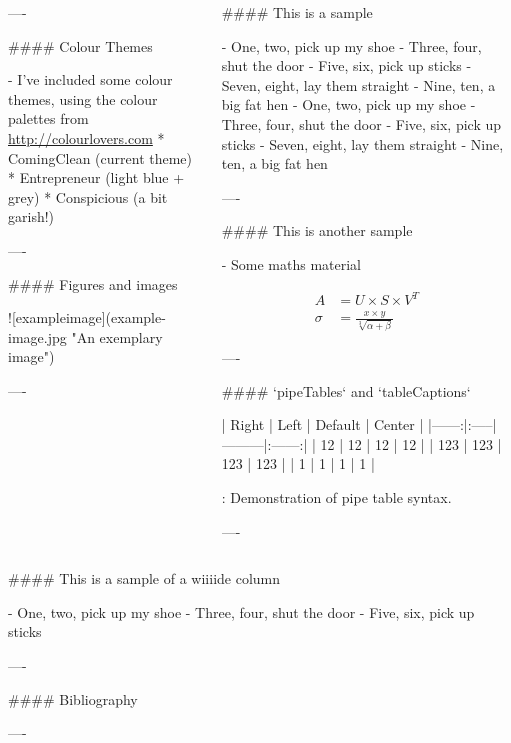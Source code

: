 \documentclass{beamer}
\begin{document}
\begin{frame}[fragile]
\begin{columns}[T]
\begin{column}{.46\textwidth}
\begin{markdown}
----

#### Colour Themes

- I've included some colour themes, using the colour palettes from \url{http://colourlovers.com}
    * ComingClean (current theme)
    * Entrepreneur (light blue + grey)
    * Conspicious (a bit garish!)

---- 

#### Figures and images


![exampleimage](example-image.jpg "An exemplary image")

----

\end{markdown}

\end{column}

\begin{column}{.46\textwidth}

\begin{markdown}

#### This is a sample

- One, two, pick up my shoe
- Three, four, shut the door
- Five, six, pick up sticks
- Seven, eight, lay them straight
- Nine, ten, a big fat hen
- One, two, pick up my shoe
- Three, four, shut the door
- Five, six, pick up sticks
- Seven, eight, lay them straight
- Nine, ten, a big fat hen

----

#### This is another sample

- Some maths material

\begin{align}
A &= U \times S \times V^T\\
\sigma &= \frac{x\times y}{\sqrt[3]{\alpha + \beta}}
\end{align}

----


#### `pipeTables` and `tableCaptions`

| Right | Left | Default | Center |
|------:|:-----|---------|:------:| 
|  12   |  12  |  12     |   12   | 
| 123   |  123 |   123   |  123   | 
|   1   |    1 |     1   |    1   | 

  : Demonstration of pipe table syntax.

----

\end{markdown}
\end{column}
\end{columns}

\begin{markdown}

#### This is a sample of a wiiiide column

- One, two, pick up my shoe
- Three, four, shut the door
- Five, six, pick up sticks

----

#### Bibliography




----

\end{markdown}

\end{frame}
\end{document}
